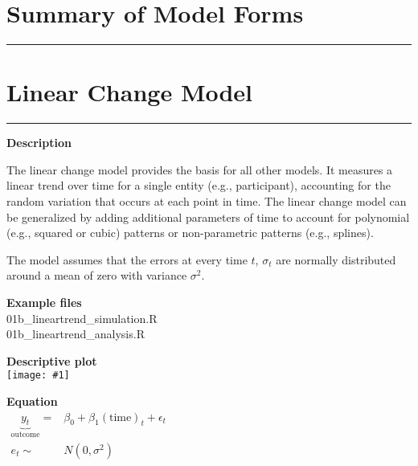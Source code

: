 \documentclass[10pt, landscape, article]{memoir}
\newcommand{\outcome}[1]{\underbrace{#1}_{\text{outcome}}}
\newenvironment{desc}{
    \begin{minipage}[t][.6\textheight][t]{.9\textwidth}
    \setlength{\parskip}{.5\baselineskip}
    \textbf{\large Description}\\\raggedright
}{
    \end{minipage}
}
\newenvironment{eqn}{
    \begin{minipage}[t][.39\textheight][t]{\textwidth}
    \textbf{\large Equation}\\
}{
    \end{minipage}
}
\newcommand{\datafig}[1]{
    \begin{minipage}[t][.6\textheight][t]{\textwidth}%
    \textbf{\large Descriptive plot}\\
    \texttt{[image: \#1]}%
    \end{minipage}
}
\newenvironment{files}{
    \begin{minipage}[t][.2\textheight][t]{\textwidth}
    \textbf{\large Example files}\\
}{
    \end{minipage}
}
\begin{document}


\chapter{Summary of Model Forms}
\label{equations}
\rule[\baselineskip]{\textwidth}{3pt}

\vfill
\newpage



\chapter{Linear Change Model}
\label{linear}
\rule[\baselineskip]{\textwidth}{3pt}
\begin{minipage}[t][.9\textheight][t]{.4\textwidth}
\begin{desc}
The linear change model provides the basis for all other models. It measures a linear trend over time for a single entity (e.g., participant), accounting for the random variation that occurs at each point in time. The linear change model can be generalized by adding additional parameters of time to account for polynomial (e.g., squared or cubic) patterns or non-parametric patterns (e.g., splines). 

The model assumes that the errors at every time $t$, $\sigma_t$ are normally distributed around a mean of zero with variance $\sigma^2$.
\end{desc}
\begin{files}
01b\_lineartrend\_simulation.R\\01b\_lineartrend\_analysis.R
\end{files}
\end{minipage} %
\begin{minipage}[t][.9\textheight][t]{.6\textwidth}
\datafig{linear.pdf}
\begin{eqn}
$\begin{array}{rl}
\outcome{y_t} = & \beta_0 + \beta_1(\text{time})_t + \epsilon_t \\
e_t \sim & N(0, \sigma^2)
\end{array}$
\end{eqn}
\end{minipage}
\newpage
\end{document}

